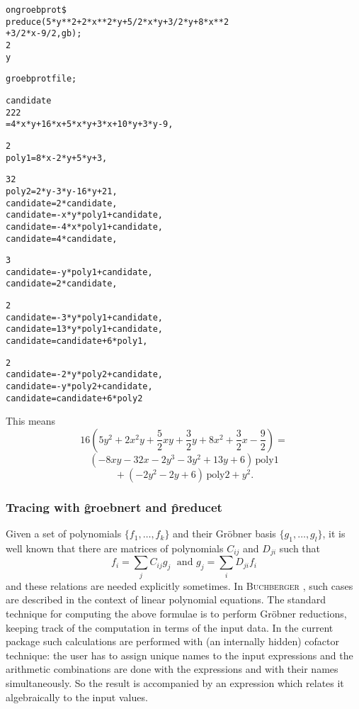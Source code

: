 \example {}

\begin{alltt}
  on groebprot\$ \\
  preduce(5*y**2 + 2*x**2*y + 5/2*x*y + 3/2*y + 8*x**2 \\
\hspace*{+1cm} + 3/2*x - 9/2, gb);\\[\baselineskip]

      2
     y

groebprotfile;

    {candidate
         2         2                     2
     =4*x *y + 16*x  + 5*x*y + 3*x + 10*y  + 3*y - 9,

              2
     poly1=8*x - 2*y  + 5*y + 3,

              3      2
     poly2=2*y  - 3*y  - 16*y + 21,
     candidate=2*candidate,
     candidate= - x*y*poly1 + candidate,
     candidate= - 4*x*poly1 + candidate,
     candidate=4*candidate,

                   3
     candidate= - y *poly1 + candidate,
     candidate=2*candidate,

                     2
     candidate= - 3*y *poly1 + candidate,
     candidate=13*y*poly1 + candidate,
     candidate=candidate + 6*poly1,

                     2
     candidate= - 2*y *poly2 + candidate,
     candidate= - y*poly2 + candidate,
     candidate=candidate + 6*poly2}
\end{alltt}
This means
\[
16 (5 y^2 + 2 x^2 y + \frac{5}{2} x y + \frac{3}{2} y
+ 8 x^2+ \frac{3}{2} x - \frac{9}{2})=
\]
\[
(-8 x y -32 x -2 y^3 -3 y^2 + 13 y + 6)\,\mbox{poly1}
\]
\[
\mbox{} + (-2 y^2 -2 y + 6)\,\mbox{poly2} + y^2.
\]

\subsubsection{Tracing with \f{groebnert} and \f{preducet}}
Given a set of polynomials $\{f_1,\ldots ,f_k\}$ and their Gr\"obner
basis $\{g_1,\ldots ,g_l\}$, it is well known that there are matrices of
polynomials $C_{ij}$ and $D_{ji}$ such that
\[
f_i = \displaystyle{\sum\limits_j} C_{ij} g_j \;\mbox{  and  } g_j =
\displaystyle{\sum\limits_i} D_{ji} f_i
\]
and these relations are needed explicitly sometimes.
In \textsc{Buchberger} \cite{Buchberger:85}, such cases are described in the
context of linear polynomial equations. The standard technique for
computing the above formulae is to perform
Gr\"obner reductions, keeping track of the
computation in terms of the input data. In the current package such
calculations are performed with (an internally hidden) cofactor
technique: the user has to assign unique names to the input
expressions and the  arithmetic combinations are done with the
expressions and with their names simultaneously. So the result is
accompanied by an expression which relates it algebraically to the
input values.

